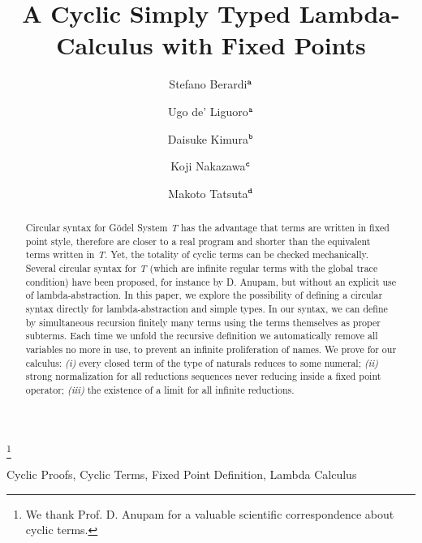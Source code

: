 \documentclass[twoside,11pt]{entics}
\begin{document}
\begin{frontmatter}

  \title{A Cyclic Simply Typed Lambda-Calculus with Fixed Points} 
 \thanks[ALL]{We thank Prof. D. Anupam for a valuable scientific correspondence about cyclic terms.}   %
  \author{Stefano Berardi$^{\tt a}$}	%
   \author{Ugo de' Liguoro$^{\tt a}$}		%
    \author{Daisuke Kimura$^{\tt b}$}
      \author{Koji Nakazawa$^{\tt c}$}
       \author{Makoto Tatsuta$^{\tt d}$}
   \address[a]{C.S. Dept., Turin University, Torino, Italy}  							
   \address[b]{Department of Information Science, Toho University, Japan} 
   \address[c]{Graduate School of Informatics, Nagoya University, Japan}
   \address[d]{National Institute of Informatics, Sokendai, Tokyo, Japan}
 
 

\begin{abstract} 
Circular syntax for G\"{o}del System {\em T} has the advantage
that terms are written in fixed point style, therefore are closer to a real
program and shorter than the equivalent terms written in {\em T}. Yet, the 
totality of cyclic terms can be checked mechanically. 
Several circular syntax for {\em T} (which are infinite regular terms with the 
global trace condition) have been proposed, for instance by D. Anupam,
but without an explicit use of lambda-abstraction.
In this paper, we explore the possibility of defining a circular syntax 
directly for lambda-abstraction and simple types. 
In our syntax, we can define by simultaneous recursion 
finitely many terms using the terms themselves as proper subterms. Each time we
unfold the recursive definition we automatically 
remove all variables no more in use, to prevent an infinite proliferation of names.
We prove for our calculus:
\emph{(i)}  every closed term of the type of naturals reduces to some numeral;
\emph{(ii)}  strong normalization for all reductions sequences never reducing inside a fixed point operator; 
\emph{(iii)} the existence of a limit for all infinite reductions.
\end{abstract}
\begin{keyword}
  Cyclic Proofs, Cyclic Terms, Fixed Point Definition, Lambda Calculus
\end{keyword}
\end{frontmatter}
\end{document}
